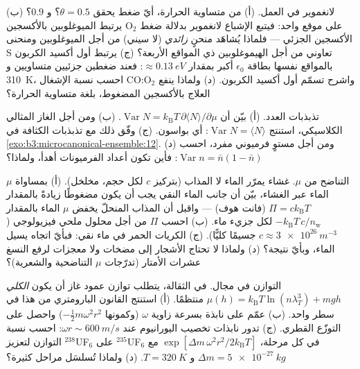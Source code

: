 \begin{exercise}[$\star\star$]\label{exo:b3:grand-canonical:6}
لانغموير في العمل. (أ) من متساوية الحرارة، أيّ ضغط يحقق
$\theta = 0.5$؟ و $0.9$؟ (ب) يرتبط الميوغلوبين بالأكسجين O$_2$ على موقع واحد:
فيتبع الإشباع لانغموير بدلالة ضغط الأكسجين الجزئي ---
فلماذا يُشاهَد منحنٍ \emph{زائدي} (لا سيني) من أجل
الميوغلوبين ومنحنى S تعاوني من أجل الهيموغلوبين ذي المواقع الأربعة؟
(ج) يرتبط أول أكسيد الكربون بالمواقع نفسها بطاقة $\epsilon_0$
أكبر بمقدار $\approx\qty{0.13}{eV}$: فعند ضغطين جزئيين متساويين و
\qty{310}{K}، احسب نسبة الإشغال CO:O$_2$ واشرح تسمّم
أول أكسيد الكربون. (د) ولماذا ينفع العلاج بالأكسجين المضغوط، بلغة
متساوية الحرارة؟
\end{exercise}

\begin{exercise}[$\star\star$]\label{exo:b3:grand-canonical:7}
تذبذبات العدد. (أ) بيّن أن $\operatorname{Var}N =
k_{\text{B}}T\,\partial\langle N\rangle/\partial\mu$. (ب) ومن أجل
الغاز المثالي الكلاسيكي، استنتج $\operatorname{Var}N = \langle
N\rangle$: أي بواسون. (ج) وفّق ذلك مع تذبذبات الكثافة في
\cref{exo:b3:microcanonical-ensemble:12}. (د) ومن أجل مستوٍ
فرميوني مفرد، احسب $\operatorname{Var}n = \bar n(1 - \bar
n)$: فأين تكون أعداد الفرميونات أهدأ، ولماذا؟
\end{exercise}

\begin{exercise}[$\star\star$]\label{exo:b3:grand-canonical:8}
التناضح من $\mu$. غشاء يمرّر الماء لا المذاب
(بتركيز $c$ لكل حجم، مخلخل). (أ) بمساواة $\mu$ الماء
عبر الغشاء، بيّن أن جانب الماء النقي يجب أن يكون
مضغوطًا زيادةً بالمقدار $\Pi = ck_{\text{B}}T$ (فانت هوف) --- واقبل
أن المذاب المنحلّ يخفض $\mu$ الماء بالمقدار
$-k_{\text{B}}T\,c/n_{\text{w}}$ لكل جزيء ماء. (ب) احسب
$\Pi$ من أجل محلول ملحي فيزيولوجي ($c \approx \qty{3e26}{m^{-3}}$
جسيمًا كليًّا). (ج) الكريات الحمر في ماء نقي: فبأيّ اتجاه يسيل
الماء، وبأيّ نتيجة؟ (د) ولماذا لا تحتاج الأشجار إلى مضخات
ولا معجزات لرفع النسغ عشرات الأمتار (تدرّجات $\mu$ التناضحية
والشعرية)؟
\end{exercise}

\begin{exercise}[$\star\star$]\label{exo:b3:grand-canonical:9}
التوازن في مجال. في الثقالة، يتطلب توازن عمود غاز
أن يكون  \emph{الكلي} $\mu(h) =
k_{\text{B}}T\ln(n\lambda_T^3) + mgh$ منتظمًا. (أ) استنتج
القانون البارومتري من هذا في سطر واحد. (ب) عمّم على
نابذة بسرعة زاوية $\omega$ (وكمونها
$-\tfrac12 m\omega^2r^2$) واحصل على التوزّع القطري. (ج)
تدور نابذات تخصيب اليورانيوم عند $\omega r \sim
\qty{600}{m/s}$: احسب نسبة التوازن لتعزيز $^{238}$UF$_6$
على $^{235}$UF$_6$ في كل مرحلة، $\exp[\Delta m\,\omega^2
r^2/2k_{\text{B}}T]$ مع $\Delta m = \qty{5e-27}{kg}$ و $T =
\qty{320}{K}$. (د) ولماذا تُسلسَل مراحل كثيرة؟
\end{exercise}

